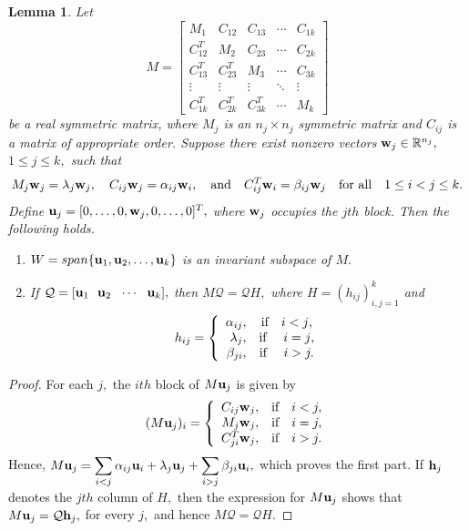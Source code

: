 \documentclass[12pt,a4paper]{article}
\newtheorem{lem}{Lemma}
\def \h {{\bf h}}
\def \u {{\bf u}}
\def \w {{\bf w}}
\begin{document}
\begin{lem}\label{6l1}
    Let \[M=\begin{bmatrix}
        M_1 & C_{12} & C_{13} &\cdots & C_{1k}\\
        C_{12}^T & M_2 & C_{23} &\cdots & C_{2k}\\ 
        C_{13}^T & C_{23}^T & M_3  &\cdots & C_{3k}\\
        \vdots & \vdots & \vdots & \ddots & \vdots\\
         C_{1k}^T & C_{2k}^T & C_{3k}^T & \cdots & M_k
        \end{bmatrix}\] be a real symmetric matrix, where $M_j$ is an $n_j\times n_j$ symmetric matrix and $C_{ij}$ is a matrix of appropriate order. Suppose there exist nonzero vectors $\w_j\in\mathbb{R}^{n_j},$ $1\leq j\leq k,$ such that 
        \[M_j\w_j=\lambda_j\w_j, \quad   C_{ij}\w_j=\alpha_{ij}\w_i, \quad \text{and}\quad C_{ij}^T\w_i=\beta_{ij}\w_j  \quad \text{for all}\quad 1\leq i< j\leq k.    \]
        Define $\u_j=[0,\ldots,0,\w_j,0,\ldots,0]^T,$ where $\w_j$ occupies the $jth$ block.
        Then the following holds.
        \begin{enumerate}
            \item $W=span\{\u_1,\u_2,\ldots,\u_k\}$ is an invariant subspace of $M.$ 
            \item If $\mathcal{Q}=[\u_1~~ \u_2~~ \cdots~~ \u_k],$ then $M\mathcal{Q}=\mathcal{Q}H,$ where $H=(h_{ij})_{i,j=1}^k$ and  \[h_{ij}=\left\{ \begin{array}{rcl}
            
 \alpha_{ij}, & \text{if\quad $i<j$,} \\
 \lambda_j, & \text{if \quad$i=j$,}\\

 \beta_{ji}, & \text{if \quad $i>j.$}
 \end{array}\right.\]
        \end{enumerate}
\end{lem}
\begin{proof}
   For each $j,$ the $ith$ block of $M\u_j$ is given by
   \[(M\u_j)_i=\left\{ \begin{array}{rcl}
 C_{ij}\w_j, & \text{if} \quad i<j,\\ 
 M_j\w_j, & \text{if} \quad i=j, \\
 C_{ji}^T\w_j, & \text{if} \quad i>j.
 \end{array}\right.\]
 Hence, $M\u_j=\displaystyle\sum_{i<j}\alpha_{ij}\u_i+\lambda_j\u_j+\sum_{i>j}\beta_{ji}\u_i,$ which proves the first part. If $\h_j$
denotes the $jth$ column of $H,$ then the expression for $M\u_j$ shows that
$M\u_j=\mathcal{Q}\h_j,$
for every $j,$ and hence $M\mathcal{Q}=\mathcal{Q}H.$
 \end{proof}
\end{document}
